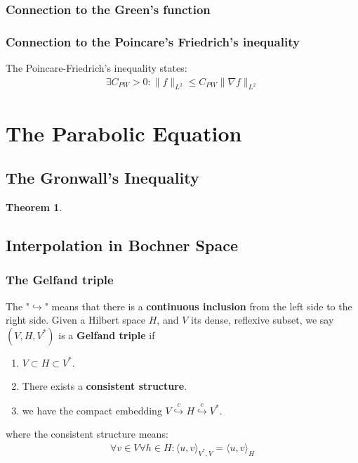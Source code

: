 \documentclass[a4paper,11pt,oneside,fleqn]{book}
\newtheorem{theorem}{Theorem}[section]
\theoremstyle{definition}
\theoremstyle{remark}
\begin{document}
\subsubsection*{Connection to the Green's function}
\subsubsection*{Connection to the Poincare's Friedrich's inequality}
The Poincare-Friedrich's inequality states:
\begin{align*}
	\exists C_{PW}>0: \| f\|_{L^2} \le C_{PW} \|\nabla f\|_{L^2}
\end{align*}




\newpage
\section{The Parabolic Equation}
\subsection{The Gronwall's Inequality}
\begin{theorem}
	
\end{theorem}


\subsection{Interpolation in Bochner Space}
 \subsubsection*{The Gelfand triple}
 The "$\hookrightarrow$" means that there is a \textbf{continuous inclusion} from the left side to the right side. Given a Hilbert space $H$, and $V$ its dense, reflexive subset, we say $(V, H, V^*)$ is a \textbf{Gelfand triple} if
 \begin{enumerate}
 	\item $V \subset H \subset V^*$. 
 	\item There exists a \textbf{consistent structure}.
 	\item we have the compact embedding $V \overset{c}{\hookrightarrow} H \overset{c}{\hookrightarrow} V^*$. 
 \end{enumerate}
 where the consistent structure means:
 \begin{align*}
 	\forall v \in V \forall h \in H: \langle u, v \rangle_{V^*, V} = \langle u, v \rangle_{H}
 \end{align*}
\end{document}
